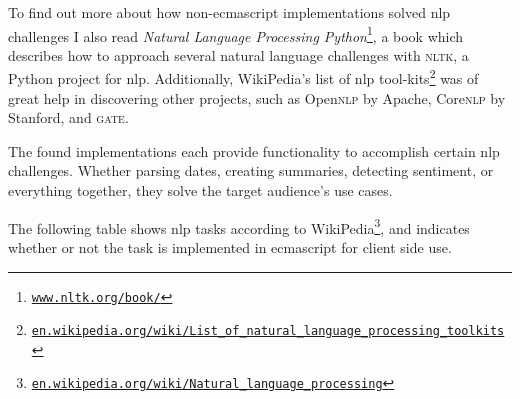 To find out more about how non-\gls{ecmascript} implementations solved
  \gls{nlp} challenges I also read \emph{Natural Language Processing
  Python}\footnote{
    \href{http://www.nltk.org/book/}{\nolinkurl{www.nltk.org/book/}}
  }, a book which describes how to approach several natural language
  challenges with \textsc{nltk}, a Python project for \gls{nlp}.
Additionally, WikiPedia's list of \gls{nlp} tool-kits\footnote{
    \href{http://en.wikipedia.org/wiki/List_of_natural_language_processing_toolkits}{\nolinkurl{en.wikipedia.org/wiki/List_of_natural_language_processing_toolkits}}
  } was of great help in discovering other projects, such as Open\textsc{nlp}
  by Apache, Core\textsc{nlp} by Stanford, and \textsc{gate}.

The found implementations each provide functionality to accomplish certain
  \gls{nlp} challenges.
Whether parsing dates, creating summaries, detecting sentiment, or everything
  together, they solve the target audience's use cases.

The following table shows \gls{nlp} tasks according to
  WikiPedia\footnote{
    \href{http://en.wikipedia.org/wiki/Natural_language_processing}{\nolinkurl{en.wikipedia.org/wiki/Natural_language_processing}}
  }, and indicates whether or not the task is implemented in
  \gls{ecmascript} for client side use.

\medskip

